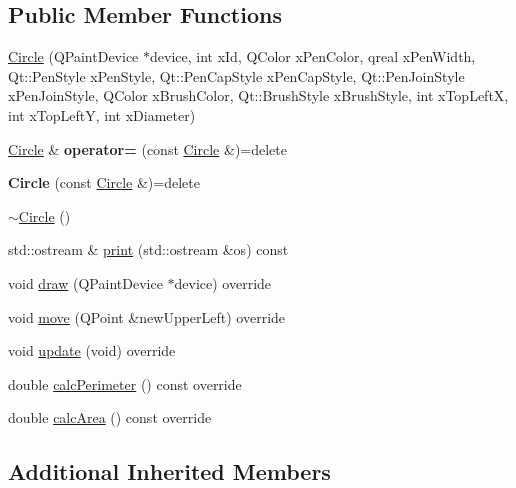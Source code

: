 \subsection*{Public Member Functions}
\begin{DoxyCompactItemize}
\item 
\hyperlink{classCircle_af4337aa5f28b63e6e3f4fba0766e4b2f}{Circle} (Q\-Paint\-Device $\ast$device, int x\-Id, Q\-Color x\-Pen\-Color, qreal x\-Pen\-Width, Qt\-::\-Pen\-Style x\-Pen\-Style, Qt\-::\-Pen\-Cap\-Style x\-Pen\-Cap\-Style, Qt\-::\-Pen\-Join\-Style x\-Pen\-Join\-Style, Q\-Color x\-Brush\-Color, Qt\-::\-Brush\-Style x\-Brush\-Style, int x\-Top\-Left\-X, int x\-Top\-Left\-Y, int x\-Diameter)
\item 
\hypertarget{classCircle_a2067c595933e8313ea1baf8ee19545f4}{\hyperlink{classCircle}{Circle} \& {\bfseries operator=} (const \hyperlink{classCircle}{Circle} \&)=delete}\label{classCircle_a2067c595933e8313ea1baf8ee19545f4}

\item 
\hypertarget{classCircle_a36efc1546de87eef6ff11c61c0d4ff34}{{\bfseries Circle} (const \hyperlink{classCircle}{Circle} \&)=delete}\label{classCircle_a36efc1546de87eef6ff11c61c0d4ff34}

\item 
\hyperlink{classCircle_ae3f30436e645d73e368e8ee55f8d1650}{$\sim$\-Circle} ()
\item 
std\-::ostream \& \hyperlink{classCircle_a8afb61e2e5b24c95d0d4514da1d45bb2}{print} (std\-::ostream \&os) const 
\item 
void \hyperlink{classCircle_ae4d43ef78c3a06cb913bbd6a7dd94783}{draw} (Q\-Paint\-Device $\ast$device) override
\item 
void \hyperlink{classCircle_a48641bff5fb13da4bceb319862fd16c1}{move} (Q\-Point \&new\-Upper\-Left) override
\item 
void \hyperlink{classCircle_ae9c239fb51beadf9d6be4861473949f5}{update} (void) override
\item 
double \hyperlink{classCircle_ad6e363f95b6a42109527071724d8ea76}{calc\-Perimeter} () const override
\item 
double \hyperlink{classCircle_a2ebf184f1aed664e3858b65ce17fa798}{calc\-Area} () const override
\end{DoxyCompactItemize}
\subsection*{Additional Inherited Members}



